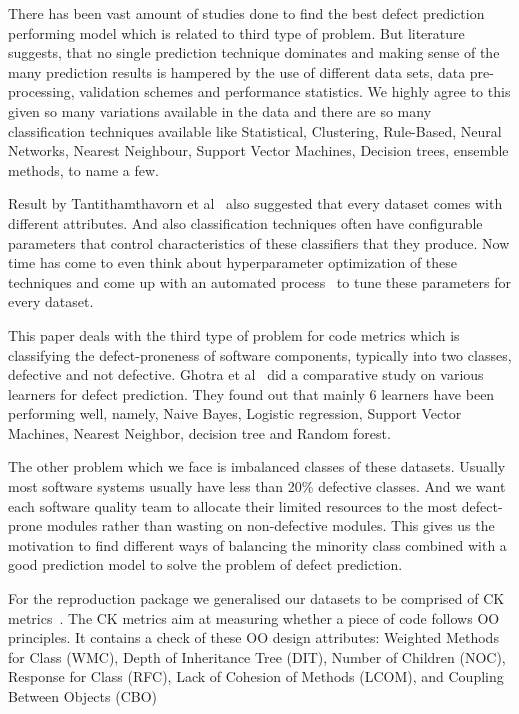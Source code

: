 \documentclass[conference]{IEEEtran}
\begin{document}
There has been vast amount of studies done to find the best defect prediction performing model which is related to third type of problem. But literature suggests, that no single prediction technique dominates and making sense of the many prediction results is hampered by the use of different data sets, data pre-processing, validation schemes and performance
statistics. We highly agree to this given so many variations available in the data and there are so many classification techniques available like Statistical, Clustering, Rule-Based, Neural Networks, Nearest Neighbour, Support Vector Machines, Decision trees, ensemble methods, to name a few.

Result by Tantithamthavorn et al~\cite{tantithamthavorn2016automated} also suggested that every dataset comes with different attributes. And also classification techniques often have configurable parameters
that control characteristics of these classifiers that they produce. Now time has come to even think about hyperparameter optimization of these techniques and come up with an automated process~\cite{agrawal2016wrong, fu2016tuning} to tune these parameters for every dataset.

This paper deals with the third type of problem for code metrics which is classifying the defect-proneness of software components, typically into two classes, defective and not defective. Ghotra et al~\cite{ghotra2015revisiting} did a comparative study on various learners for defect prediction. They found out that mainly 6 learners have been performing well, namely, Naive Bayes, Logistic regression, Support Vector Machines, Nearest Neighbor, decision tree and Random forest.

The other problem which we face is imbalanced classes of these datasets. Usually most software systems usually have less than 20\% defective classes. And we want each software quality team to allocate their limited resources to the most defect-prone
modules rather than wasting on non-defective modules. This gives us the motivation to find different ways of balancing the minority class combined with a good prediction model to solve the problem of defect prediction.

For the reproduction package we generalised our datasets to be comprised of CK metrics~\cite{chidamber1994metrics}. The CK metrics aim at measuring whether a piece of code follows OO principles. It contains a check of these OO design attributes: Weighted Methods for Class (WMC), Depth of Inheritance Tree (DIT), Number of Children (NOC), Response for Class (RFC), Lack of Cohesion of Methods (LCOM), and Coupling Between Objects (CBO)
\end{document}
